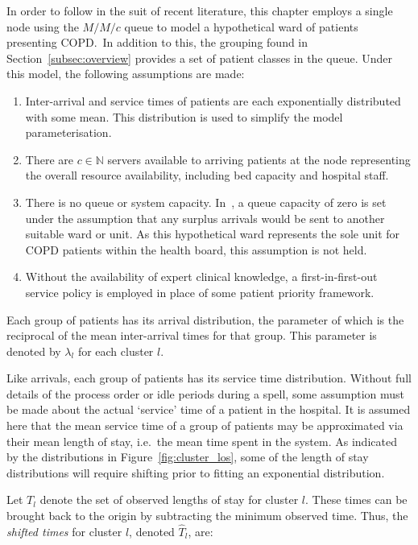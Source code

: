 In order to follow in the suit of recent literature, this chapter employs a
single node using the \(M/M/c\) queue to model a hypothetical ward of patients
presenting COPD.\ In addition to this, the grouping found in
Section~\ref{subsec:overview} provides a set of patient classes in the queue.
Under this model, the following assumptions are made:
\begin{enumerate}
    \item Inter-arrival and service times of patients are each exponentially
        distributed with some mean. This distribution is used to simplify the
        model parameterisation.
    \item There are \(c \in \mathbb{N}\) servers available to arriving patients
        at the node representing the overall resource availability, including
        bed capacity and hospital staff.
    \item There is no queue or system capacity. In~\cite{Williams2015}, a
        queue capacity of zero is set under the assumption that any surplus
        arrivals would be sent to another suitable ward or unit. As this
        hypothetical ward represents the sole unit for COPD patients within the
        health board, this assumption is not held.
    \item Without the availability of expert clinical knowledge, a
        first-in-first-out service policy is employed in place of some patient
        priority framework.
\end{enumerate}

Each group of patients has its arrival distribution, the parameter of which is
the reciprocal of the mean inter-arrival times for that group. This parameter
is denoted by \(\lambda_l\) for each cluster \(l\).

Like arrivals, each group of patients has its service time distribution.
Without full details of the process order or idle periods during a spell, some
assumption must be made about the actual `service' time of a patient in the
hospital. It is assumed here that the mean service time of a group of patients
may be approximated via their mean length of stay, i.e.\ the mean time spent in
the system. As indicated by the distributions in Figure~\ref{fig:cluster_los},
some of the length of stay distributions will require shifting prior to fitting
an exponential distribution.

Let \(T_l\) denote the set of observed lengths of stay for cluster \(l\). These
times can be brought back to the origin by subtracting the minimum observed
time. Thus, the \emph{shifted times} for cluster \(l\), denoted
\(\widehat T_l\), are:

